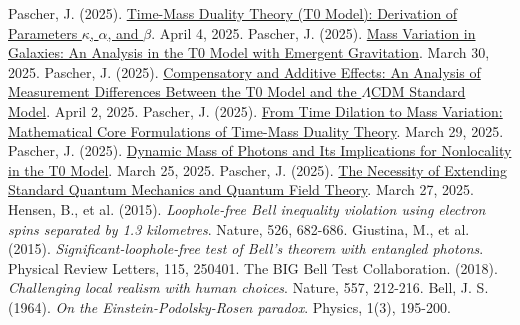 \documentclass[a4paper,12pt]{article}
\theoremstyle{definition}
\theoremstyle{remark}
\begin{document}
	\begin{thebibliography}{99}
		 Pascher, J. (2025). \href{https://github.com/jpascher/T0-Time-Mass-Duality/tree/main/2/pdf/English/Zeit-Masse-Dualitätstheorie (T0-Modell) Herleitung der Parameter kappa, alpha und beta_en.pdf}{Time-Mass Duality Theory (T0 Model): Derivation of Parameters \(\kappa\), \(\alpha\), and \(\beta\)}. April 4, 2025.
		 Pascher, J. (2025). \href{https://github.com/jpascher/T0-Time-Mass-Duality/tree/main/2/pdf/English/Massenvariation in Galaxien_en.pdf}{Mass Variation in Galaxies: An Analysis in the T0 Model with Emergent Gravitation}. March 30, 2025.
		 Pascher, J. (2025). \href{https://github.com/jpascher/T0-Time-Mass-Duality/tree/main/2/pdf/English/Analyse der Messdifferenzen zwischen dem T0-Modell und dem Standardmodell_en.pdf}{Compensatory and Additive Effects: An Analysis of Measurement Differences Between the T0 Model and the \(\Lambda\)CDM Standard Model}. April 2, 2025.
		 Pascher, J. (2025). \href{https://github.com/jpascher/T0-Time-Mass-Duality/tree/main/2/pdf/English/Mathematische Formulierungen der Zeit-Masse-Dualitätstheorie mit Lagrange_en.pdf}{From Time Dilation to Mass Variation: Mathematical Core Formulations of Time-Mass Duality Theory}. March 29, 2025.
		 Pascher, J. (2025). \href{https://github.com/jpascher/T0-Time-Mass-Duality/tree/main/2/pdf/English/Dynamische Masse von Photonen und ihre Implikationen für Nichtlokalität_en.tex}{Dynamic Mass of Photons and Its Implications for Nonlocality in the T0 Model}. March 25, 2025.
		 Pascher, J. (2025). \href{https://github.com/jpascher/T0-Time-Mass-Duality/tree/main/2/pdf/English/Die Notwendigkeit einer Erweiterung der Standard-Quantenmechanik und Quantenfeldtheorie_en.pdf}{The Necessity of Extending Standard Quantum Mechanics and Quantum Field Theory}. March 27, 2025.
		 Hensen, B., et al. (2015). \textit{Loophole-free Bell inequality violation using electron spins separated by 1.3 kilometres}. Nature, 526, 682-686.
		 Giustina, M., et al. (2015). \textit{Significant-loophole-free test of Bell’s theorem with entangled photons}. Physical Review Letters, 115, 250401.
		 The BIG Bell Test Collaboration. (2018). \textit{Challenging local realism with human choices}. Nature, 557, 212-216.
		 Bell, J. S. (1964). \textit{On the Einstein-Podolsky-Rosen paradox}. Physics, 1(3), 195-200.

\end{thebibliography}
\end{document}
